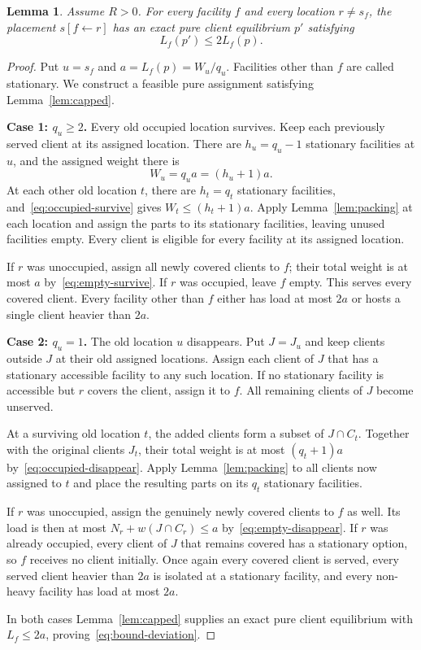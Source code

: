 \documentclass[11pt]{amsart}
\newtheorem{lemma}[theorem]{Lemma}
\theoremstyle{definition}
\begin{document}
\begin{lemma}\label{lem:deviation}
Assume $R>0$. For every facility $f$ and every location $r\ne s_f$, the placement $s[f\leftarrow r]$ has an exact pure client equilibrium $p'$ satisfying
\begin{equation}\label{eq:bound-deviation}
 L_f(p')\le2L_f(p).
\end{equation}
\end{lemma}
\begin{proof}
Put $u=s_f$ and $a=L_f(p)=W_u/q_u$. Facilities other than $f$ are called stationary. We construct a feasible pure assignment satisfying Lemma~\ref{lem:capped}.

\textbf{Case 1: $q_u\ge2$.}
Every old occupied location survives. Keep each previously served client at its assigned location. There are $h_u=q_u-1$ stationary facilities at $u$, and the assigned weight there is
\[
 W_u=q_ua=(h_u+1)a.
\]
At each other old location $t$, there are $h_t=q_t$ stationary facilities, and~\eqref{eq:occupied-survive} gives $W_t\le(h_t+1)a$. Apply Lemma~\ref{lem:packing} at each location and assign the parts to its stationary facilities, leaving unused facilities empty. Every client is eligible for every facility at its assigned location.

If $r$ was unoccupied, assign all newly covered clients to $f$; their total weight is at most $a$ by~\eqref{eq:empty-survive}. If $r$ was occupied, leave $f$ empty. This serves every covered client. Every facility other than $f$ either has load at most $2a$ or hosts a single client heavier than $2a$.

\textbf{Case 2: $q_u=1$.}
The old location $u$ disappears. Put $J=J_u$ and keep clients outside $J$ at their old assigned locations. Assign each client of $J$ that has a stationary accessible facility to any such location. If no stationary facility is accessible but $r$ covers the client, assign it to $f$. All remaining clients of $J$ become unserved.

At a surviving old location $t$, the added clients form a subset of $J\cap C_t$. Together with the original clients $J_t$, their total weight is at most $(q_t+1)a$ by~\eqref{eq:occupied-disappear}. Apply Lemma~\ref{lem:packing} to all clients now assigned to $t$ and place the resulting parts on its $q_t$ stationary facilities.

If $r$ was unoccupied, assign the genuinely newly covered clients to $f$ as well. Its load is then at most $N_r+w(J\cap C_r)\le a$ by~\eqref{eq:empty-disappear}. If $r$ was already occupied, every client of $J$ that remains covered has a stationary option, so $f$ receives no client initially. Once again every covered client is served, every served client heavier than $2a$ is isolated at a stationary facility, and every non-heavy facility has load at most $2a$.

In both cases Lemma~\ref{lem:capped} supplies an exact pure client equilibrium with $L_f\le2a$, proving~\eqref{eq:bound-deviation}.
\end{proof}
\end{document}
